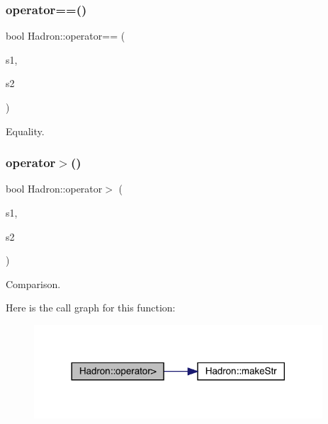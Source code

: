 \subsubsection{\texorpdfstring{operator==()}{operator==()}\hspace{0.1cm}{\footnotesize\ttfamily [5/5]}}
{\footnotesize\ttfamily bool Hadron\+::operator== (\begin{DoxyParamCaption}\item[{const \mbox{\hyperlink{structHadron_1_1HadronDiagramTimeSlices__t}{Hadron\+Diagram\+Time\+Slices\+\_\+t}} \&}]{s1,  }\item[{const \mbox{\hyperlink{structHadron_1_1HadronDiagramTimeSlices__t}{Hadron\+Diagram\+Time\+Slices\+\_\+t}} \&}]{s2 }\end{DoxyParamCaption})}



Equality. 

\mbox{\label{namespaceHadron_a341b896434c5621c127ef5066c50c7f0}} 
\subsubsection{\texorpdfstring{operator$>$()}{operator>()}}
{\footnotesize\ttfamily bool Hadron\+::operator$>$ (\begin{DoxyParamCaption}\item[{const \mbox{\hyperlink{structHadron_1_1HadronVertex__t}{Hadron\+Vertex\+\_\+t}} \&}]{s1,  }\item[{const \mbox{\hyperlink{structHadron_1_1HadronVertex__t}{Hadron\+Vertex\+\_\+t}} \&}]{s2 }\end{DoxyParamCaption})}



Comparison. 

Here is the call graph for this function\+:
\nopagebreak
\begin{figure}[H]
\begin{center}
\leavevmode
\includegraphics[width=305pt]{d1/daf/namespaceHadron_a341b896434c5621c127ef5066c50c7f0_cgraph}
\end{center}
\end{figure}
\mbox{\label{namespaceHadron_a8f8a77c02a6415ffc31d2a300f59e6a6}} 
